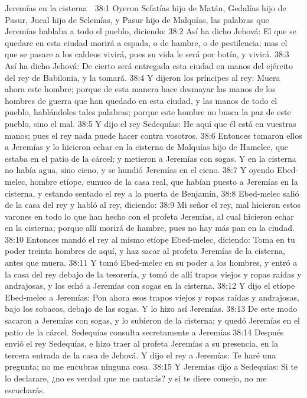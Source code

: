 Jeremías en la cisterna  

38:1 Oyeron Sefatías hijo de Matán, Gedalías hijo de Pasur, Jucal hijo de Selemías, y Pasur hijo de Malquías, las palabras que Jeremías hablaba a todo el pueblo, diciendo:  
38:2 Así ha dicho Jehová: El que se quedare en esta ciudad morirá a espada, o de hambre, o de pestilencia; mas el que se pasare a los caldeos vivirá, pues su vida le será por botín, y vivirá.  
38:3 Así ha dicho Jehová: De cierto será entregada esta ciudad en manos del ejército del rey de Babilonia, y la tomará.  
38:4 Y dijeron los príncipes al rey: Muera ahora este hombre; porque de esta manera hace desmayar las manos de los hombres de guerra que han quedado en esta ciudad, y las manos de todo el pueblo, hablándoles tales palabras; porque este hombre no busca la paz de este pueblo, sino el mal.  
38:5 Y dijo el rey Sedequías: He aquí que él está en vuestras manos; pues el rey nada puede hacer contra vosotros.  
38:6 Entonces tomaron ellos a Jeremías y lo hicieron echar en la cisterna de Malquías hijo de Hamelec, que estaba en el patio de la cárcel; y metieron a Jeremías con sogas. Y en la cisterna no había agua, sino cieno, y se hundió Jeremías en el cieno.  
38:7 Y oyendo Ebed-melec, hombre etíope, eunuco de la casa real, que habían puesto a Jeremías en la cisterna, y estando sentado el rey a la puerta de Benjamín,  
38:8 Ebed-melec salió de la casa del rey y habló al rey, diciendo:  
38:9 Mi señor el rey, mal hicieron estos varones en todo lo que han hecho con el profeta Jeremías, al cual hicieron echar en la cisterna; porque allí morirá de hambre, pues no hay más pan en la ciudad.  
38:10 Entonces mandó el rey al mismo etíope Ebed-melec, diciendo: Toma en tu poder treinta hombres de aquí, y haz sacar al profeta Jeremías de la cisterna, antes que muera.  
38:11 Y tomó Ebed-melec en su poder a los hombres, y entró a la casa del rey debajo de la tesorería, y tomó de allí trapos viejos y ropas raídas y andrajosas, y los echó a Jeremías con sogas en la cisterna.  
38:12 Y dijo el etíope Ebed-melec a Jeremías: Pon ahora esos trapos viejos y ropas raídas y andrajosas, bajo los sobacos, debajo de las sogas. Y lo hizo así Jeremías.  
38:13 De este modo sacaron a Jeremías con sogas, y lo subieron de la cisterna; y quedó Jeremías en el patio de la cárcel.  
Sedequías consulta secretamente a Jeremías  
38:14 Después envió el rey Sedequías, e hizo traer al profeta Jeremías a su presencia, en la tercera entrada de la casa de Jehová. Y dijo el rey a Jeremías: Te haré una pregunta; no me encubras ninguna cosa.  
38:15 Y Jeremías dijo a Sedequías: Si te lo declarare, ¿no es verdad que me matarás? y si te diere consejo, no me escucharás.  
